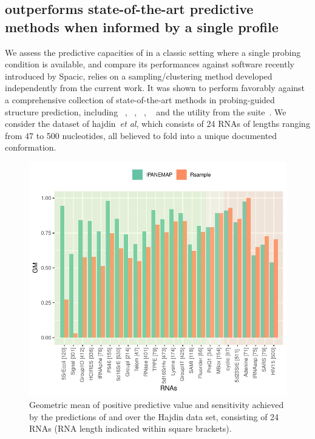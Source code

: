 \documentclass[a4,center,fleqn]{NAR}
\begin{document}



\subsection*{\OurTool outperforms state-of-the-art predictive methods when informed by a single profile}
We assess the predictive capacities of \OurTool in a classic setting where a single probing condition is available, and compare its performances against  software recently introduced by Spacic\etal\cite{Spasic2017},  relies on a sampling/clustering method developed independently from the current work. It was shown to perform favorably against a comprehensive collection of state-of-the-art methods in probing-guided structure prediction, including ~\citep{Wu2015}, ~\citep{Deng2016}, ~\citep{Washietl2012}, ~\citep{Zarringhalam2012} and the  utility from the  suite~\citep{Reuter2010}.
We consider the dataset of hajdin~\emph{et al}, which consists of 24 RNAs of lengths ranging from 47 to 500 nucleotides, all believed to fold into a unique documented conformation. 

\begin{figure}
	\includegraphics[width=\linewidth]{graphs/RsampleVsIPANEMAP/Accuracy}
	\caption{Geometric mean of positive predictive value and sensitivity achieved by the predictions of \OurTool{} and  over the Hajdin\etal\cite{Hajdin2013} data set, consisting of 24 RNAs (RNA length indicated within square brackets). \label{fig:Vsrsample}}
\end{figure}
\end{document}
